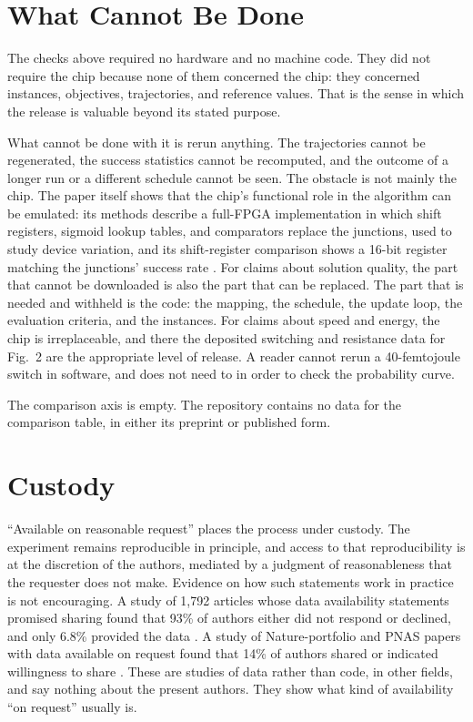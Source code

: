 \documentclass[11pt]{article}
\theoremstyle{definition}
\theoremstyle{remark}
\begin{document}
\section{What Cannot Be Done}

The checks above required no hardware and no machine code. They did not require the chip because none of them concerned the chip: they concerned instances, objectives, trajectories, and reference values. That is the sense in which the release is valuable beyond its stated purpose.

What cannot be done with it is rerun anything. The trajectories cannot be regenerated, the success statistics cannot be recomputed, and the outcome of a longer run or a different schedule cannot be seen. The obstacle is not mainly the chip. The paper itself shows that the chip's functional role in the algorithm can be emulated: its methods describe a full-FPGA implementation in which shift registers, sigmoid lookup tables, and comparators replace the junctions, used to study device variation, and its shift-register comparison shows a 16-bit register matching the junctions' success rate \cite{li2026}. For claims about solution quality, the part that cannot be downloaded is also the part that can be replaced. The part that is needed and withheld is the code: the mapping, the schedule, the update loop, the evaluation criteria, and the instances. For claims about speed and energy, the chip is irreplaceable, and there the deposited switching and resistance data for Fig.~2 are the appropriate level of release. A reader cannot rerun a 40-femtojoule switch in software, and does not need to in order to check the probability curve.

The comparison axis is empty. The repository contains no data for the comparison table, in either its preprint or published form.

\section{Custody}

``Available on reasonable request'' places the process under custody. The experiment remains reproducible in principle, and access to that reproducibility is at the discretion of the authors, mediated by a judgment of reasonableness that the requester does not make. Evidence on how such statements work in practice is not encouraging. A study of 1,792 articles whose data availability statements promised sharing found that 93\% of authors either did not respond or declined, and only 6.8\% provided the data \cite{gabelica2022}. A study of Nature-portfolio and PNAS papers with data available on request found that 14\% of authors shared or indicated willingness to share \cite{acciai2023}. These are studies of data rather than code, in other fields, and say nothing about the present authors. They show what kind of availability ``on request'' usually is.
\end{document}
